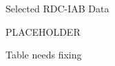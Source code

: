 \begin{table}

\caption{\label{tab:iabtable1}Selected RDC-IAB Data}
\centering

PLACEHOLDER

Table needs fixing

\end{table}